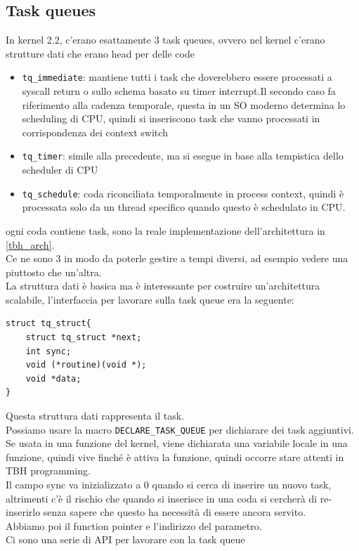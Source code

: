 \documentclass[12pt, oneside]{extbook}
\begin{document}
\subsection{Task queues}
In kernel 2.2, c'erano esattamente 3 task queues, ovvero nel kernel c'erano strutture dati che erano head per delle code
\begin{itemize}
\item \texttt{tq\_immediate}: mantiene tutti i task che doverebbero essere processati a syscall return o sullo schema basato su timer interrupt.Il secondo caso fa riferimento alla cadenza temporale, questa in un SO moderno determina lo scheduling di CPU, quindi si inseriscono task che vanno processati in corrispondenza dei context switch
\item \texttt{tq\_timer}: simile alla precedente, ma si esegue in base alla tempistica dello scheduler di CPU
\item \texttt{tq\_schedule}: coda riconciliata temporalmente in process context, quindi è processata solo da un thread specifico quando questo è schedulato in CPU.
\end{itemize}
ogni coda contiene task, sono la reale implementazione dell'architettura in \ref{tbh_arch}.\\Ce ne sono 3 in modo da poterle gestire a tempi diversi, ad esempio vedere una piuttosto che un'altra.\\La struttura dati è basica ma è interessante per costruire un'architettura scalabile, l'interfaccia per lavorare sulla task queue era la seguente:
\begin{lstlisting}
struct tq_struct{
	struct tq_struct *next;
	int sync;
	void (*routine)(void *);
	void *data;
}
\end{lstlisting}
Questa struttura dati rappresenta il task.\\Possiamo usare la macro \texttt{DECLARE\_TASK\_QUEUE} per dichiarare dei task aggiuntivi. Se usata in una funzione del kernel, viene dichiarata una variabile locale in una funzione, quindi vive finché è attiva la funzione, quindi occorre stare attenti in TBH programming.\\Il campo sync va inizializzato a 0 quando si cerca di inserire un nuovo task, altrimenti c'è il rischio che quando si inserisce in una coda si cercherà di re-inserirlo senza sapere che questo ha necessità di essere ancora servito.\\Abbiamo poi il function pointer e l'indirizzo del parametro.\\ Ci sono una serie di API per lavorare con la task queue
\end{document}
